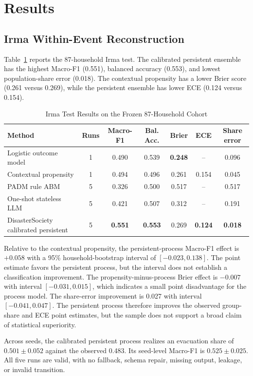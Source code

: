 \documentclass[journal]{IEEEtran}
\newcommand{\method}{DisasterSociety}
\begin{document}
\section{Results}
\subsection{Irma Within-Event Reconstruction}
Table~\ref{tab:irma-main} reports the 87-household Irma test. The calibrated
persistent ensemble
has the highest Macro-F1 (0.551), balanced accuracy (0.553), and lowest
population-share error (0.018). The contextual propensity has a lower Brier
score (0.261 versus 0.269), while the persistent ensemble has lower ECE
(0.124 versus 0.154).

\begin{table}[!t]
\caption{Irma Test Results on the Frozen 87-Household Cohort}
\label{tab:irma-main}
\centering
\small
\begin{tabular}{lcccccc}
\toprule
Method & Runs & Macro-F1 & Bal. Acc. & Brier & ECE & Share error\\
\midrule
Logistic outcome model & 1 & 0.490 & 0.539 & \textbf{0.248} & -- & 0.096\\
Contextual propensity & 1 & 0.494 & 0.496 & 0.261 & 0.154 & 0.045\\
PADM rule ABM & 5 & 0.326 & 0.500 & 0.517 & -- & 0.517\\
One-shot stateless LLM & 5 & 0.421 & 0.507 & 0.312 & -- & 0.191\\
\method{} calibrated persistent & 5 & \textbf{0.551} & \textbf{0.553} &
0.269 & \textbf{0.124} & \textbf{0.018}\\
\bottomrule
\end{tabular}
\end{table}

Relative to the contextual propensity, the persistent-process Macro-F1 effect
is $+0.058$
with a 95\% household-bootstrap interval of $[-0.023,0.138]$. The point
estimate favors the persistent process, but the interval does not establish a
classification improvement. The propensity-minus-process Brier effect is
$-0.007$ with interval $[-0.031,0.015]$, which indicates a small point
disadvantage for the process model. The share-error improvement is 0.027 with
interval $[-0.041,0.047]$. The persistent process therefore improves the
observed group-share and ECE point estimates, but the sample does not support a
broad claim of statistical superiority.

Across seeds, the calibrated persistent process realizes an evacuation share of
$0.501\pm0.052$ against the observed 0.483. Its seed-level Macro-F1 is
$0.525\pm0.025$. All five runs are valid, with no fallback, schema repair,
missing output, leakage, or invalid transition.
\end{document}
